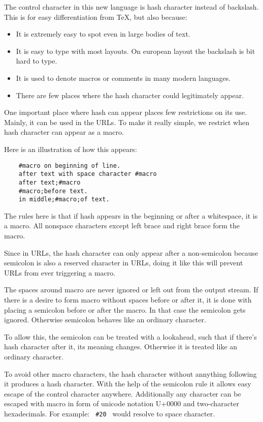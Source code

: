 \documentclass{article}
\begin{document}
The control character in this new language is hash character
instead of backslash. This is for easy differentiation from
TeX, but also because:
\begin{itemize}
    \item
        It is extremely easy to spot even in large bodies of
        text.
    \item
        It is easy to type with most layouts. On european
        layout the backslash is bit hard to type.
    \item
        It is used to denote macros or comments in many
        modern languages.
    \item
        There are few places where the hash character could
        legitimately appear.
\end{itemize}

One important place where hash can appear places few
restrictions on its use. Mainly, it can be used in the URLs.
To make it really simple, we restrict when hash character
can appear as a macro.

Here is an illustration of how this appears:

\begin{verbatim}
    #macro on beginning of line.
    after text with space character #macro
    after text;#macro
    #macro;before text.
    in middle;#macro;of text.
\end{verbatim}

The rules here is that if hash appears in the beginning or
after a whitespace, it is a macro. All nonspace characters
except left brace and right brace form the macro.

Since in URLs, the hash character can only appear after a
non-semicolon because semicolon is also a reserved character
in URLs, doing it like this will prevent URLs from ever
triggering a macro.

The spaces around macro are never ignored or left out from
the output stream. If there is a desire to form macro
without spaces before or after it, it is done with placing a
semicolon before or after the macro. In that case the
semicolon gets ignored. Otherwise semicolon behaves like an
ordinary character.

To allow this, the semicolon can be treated with a
lookahead, such that if there's hash character after it, its
meaning changes. Otherwise it is treated like an ordinary
character.

To avoid other macro characters, the hash character without
annything following it produces a hash character. With the
help of the semicolon rule it allows easy escape of the
control character anywhere. Additionally any character can
be escaped with macro in form of unicode notation U+0000 and
two-character hexadecimals. For example: \verb= #20 = would
resolve to space character.
\end{document}
